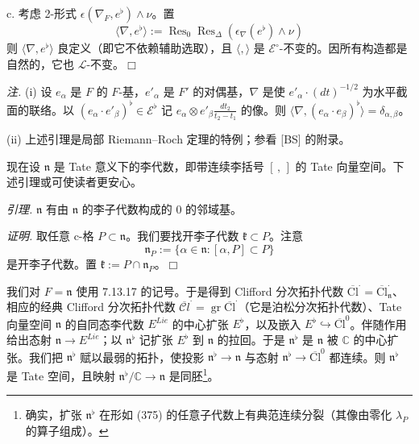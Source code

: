 c. 考虑 2-形式 $\epsilon(\nabla_{F},e^{\flat})\wedge\nu$。置
\[
\langle\nabla,e^{\flat}\rangle:=\operatorname{Res}_{0}\operatorname{Res}_{\Delta}(\epsilon_{\nabla}(e^{\flat})\wedge\nu)
\]
则 $\langle\nabla,e^{\flat}\rangle$ 良定义（即它不依赖辅助选取），且 $\langle,\rangle$ 是 $\mathcal{E}^{\circ}$-不变的。因所有构造都是自然的，它也 $\mathcal{L}$-不变。\hfill$\Box$

\emph{注.} (i) 设 $e_{\alpha}$ 是 $F$ 的 $F$-基，$e'_{\alpha}$ 是 $F'$ 的对偶基，$\nabla$ 是使 $e'_{\alpha}\cdot(dt)^{-1/2}$ 为水平截面的联络。以 $(e_{\alpha}\cdot e'_{\beta})^{\flat}\in\mathcal{E}^{\flat}$ 记 $e_{\alpha}\otimes e'_{\beta}\frac{dt_{2}}{t_{2}-t_{1}}$ 的像。则 $\langle\nabla,(e_{\alpha}\cdot e_{\beta})^{\flat}\rangle=\delta_{\alpha,\beta}$。


(ii) 上述引理是局部 Riemann--Roch 定理的特例；参看 [BS] 的附录。

 现在设 $\mathfrak{n}$ 是 Tate 意义下的李代数，即带连续李括号 $[\,,\,]$ 的 Tate 向量空间。下述引理或可使读者更安心。

\emph{引理.} $\mathfrak{n}$ 有由 $\mathfrak{n}$ 的李子代数构成的 $0$ 的邻域基。

\emph{证明.} 取任意 c-格 $P\subset\mathfrak{n}$。我们要找开李子代数 $\mathfrak{k}\subset P$。注意
\begin{equation}\tag{375}
\mathfrak{n}_{P}:=\{\alpha\in\mathfrak{n}:[\alpha,P]\subset P\}
\end{equation}
是开李子代数。置 $\mathfrak{k}:=P\cap\mathfrak{n}_{P}$。\hfill$\Box$

 我们对 $F=\mathfrak{n}$ 使用 7.13.17 的记号。于是得到 Clifford 分次拓扑代数 $\overline{\mathrm{Cl}}^{\cdot}=\overline{\mathrm{Cl}}^{\cdot}_{\mathfrak{n}}$、相应的经典 Clifford 分次拓扑代数 $\overline{\mathcal{C}l}^{\cdot}=\operatorname{gr}\overline{\mathrm{Cl}}^{\cdot}$（它是泊松分次拓扑代数）、Tate 向量空间 $\mathfrak{n}$ 的自同态李代数 $E^{Lie}$ 的中心扩张 $E^{\flat}$，以及嵌入 $E^{\flat}\hookrightarrow\overline{\mathrm{Cl}}^{0}$。伴随作用给出态射 $\mathfrak{n}\to E^{Lie}$；以 $\mathfrak{n}^{\flat}$ 记扩张 $E^{\flat}$ 到 $\mathfrak{n}$ 的拉回。于是 $\mathfrak{n}^{\flat}$ 是 $\mathfrak{n}$ 被 $\mathbb{C}$ 的中心扩张。我们把 $\mathfrak{n}^{\flat}$ 赋以最弱的拓扑，使投影 $\mathfrak{n}^{\flat}\to\mathfrak{n}$ 与态射 $\mathfrak{n}^{\flat}\to\overline{\mathrm{Cl}}^{0}$ 都连续。则 $\mathfrak{n}^{\flat}$ 是 Tate 空间，且映射 $\mathfrak{n}^{\flat}/\mathbb{C}\to\mathfrak{n}$ 是同胚\footnote{确实，扩张 $\mathfrak{n}^{\flat}$ 在形如 (375) 的任意子代数上有典范连续分裂（其像由零化 $\lambda_{P}$ 的算子组成）。}。

